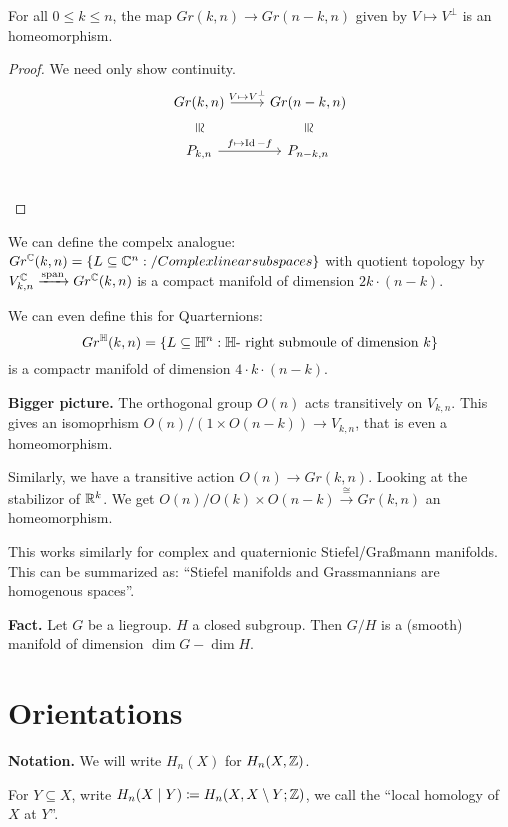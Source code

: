 \documentclass[language=english]{TemplateLecture}
\begin{document}
\begin{corollary}
    For all \(0 \leq k \leq n\), the map \(Gr(k,n) \to Gr(n-k, n)\) given by \(V \mapsto V^\perp\) is an homeomorphism.
\end{corollary}

\begin{proof}
    We need only show continuity.
    \[\begin{tikzcd}
        Gr(k,n) \ar[d, phantom, sloped, "\cong"] \ar[r, "V \mapsto V^\perp"] & Gr(n-k, n) \ar[d, phantom, "\cong", sloped] \\
        P_{k,n} \ar[r, "f \mapsto \Id - f"] & P_{n-k, n} \\
    \end{tikzcd}\]
\end{proof}

We can define the compelx analogue: \(Gr^{\mathbb{C}}(k,n) = \{ L \subseteq \mathbb{C}^n : \text/ Complex linear subspaces\}\) with quotient topology by \(V_{k,n}^{\mathbb{C}} \xrightarrow{\mathrm{span}}Gr^{\mathbb{C}}(k,n)\) is a compact manifold of dimension \(2k \cdot (n-k)\).

We can even define this for Quarternions:
\[Gr^{\mathbb{H}}(k,n) = \{L \subseteq \mathbb{H}^n : \mathbb{H}\text{- right submoule of dimension } k\}\]
is a compactr manifold of dimension \(4\cdot k \cdot (n-k)\).

\textbf{Bigger picture.}  The orthogonal group \(O(n)\) acts transitively on \(V_{k,n}\). This gives an isomoprhism \(O(n)/(1 \times O(n-k)) \to V_{k,n}\), that is even a homeomorphism.

Similarly, we have a transitive action \(O(n) \to Gr(k,n)\). Looking at the stabilizor of \(\mathbb{R}^k\). We get \(O(n)/O(k) \times O(n-k) \xrightarrow{\cong} Gr(k,n)\) an homeomorphism.

This works similarly for complex and quaternionic Stiefel/Graßmann manifolds. This can be summarized as: \enquote{Stiefel manifolds and Grassmannians are homogenous spaces}.

\textbf{Fact.} Let \(G\) be a liegroup. \(H\) a closed subgroup. Then \(G/H\) is a (smooth) manifold of dimension \(\dim G - \dim H\).


\section{Orientations}

\textbf{Notation.} We will write \(H_n(X)\) for \(H_n(X, \mathbb{Z})\).

For \(Y \subseteq X\), write \(H_n(X \mid Y)\coloneq H_n(X, X\setminus Y; \mathbb{Z})\), we call the \enquote{local homology of \(X\) at \(Y\)}.
\end{document}
